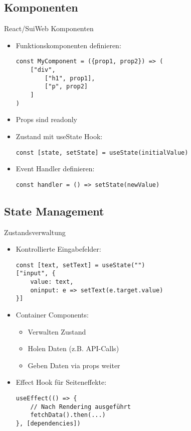 \subsection{Komponenten}
\begin{KR}{React/SuiWeb Komponenten}
    \begin{itemize}
        \item Funktionskomponenten definieren:
            \begin{verbatim}
const MyComponent = ({prop1, prop2}) => (
    ["div", 
        ["h1", prop1],
        ["p", prop2]
    ]
)
            \end{verbatim}
        \item Props sind readonly
        \item Zustand mit useState Hook:
            \begin{verbatim}
const [state, setState] = useState(initialValue)
            \end{verbatim}
        \item Event Handler definieren:
            \begin{verbatim}
const handler = () => setState(newValue)
            \end{verbatim}
    \end{itemize}
\end{KR}

\subsection{State Management}
\begin{KR}{Zustandsverwaltung}
    \begin{itemize}
        \item Kontrollierte Eingabefelder:
            \begin{verbatim}
const [text, setText] = useState("")
["input", {
    value: text,
    oninput: e => setText(e.target.value)
}]
            \end{verbatim}
        \item Container Components:
            \begin{itemize}
                \item Verwalten Zustand
                \item Holen Daten (z.B. API-Calls)
                \item Geben Daten via props weiter
            \end{itemize}
        \item Effect Hook für Seiteneffekte:
            \begin{verbatim}
useEffect(() => {
    // Nach Rendering ausgeführt
    fetchData().then(...)
}, [dependencies])
            \end{verbatim}
    \end{itemize}
\end{KR}

